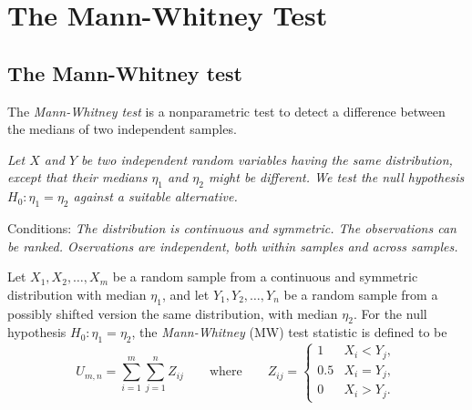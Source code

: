 \chapter{The Mann-Whitney Test}\label{chap:mannwhitney}
\setcounter{page}{1}
\startcontents[chapters]
\chapcontents

\section{The Mann-Whitney test}
The \emph{Mann-Whitney test} is a nonparametric test to detect a difference between the medians of two independent samples.

\bit
\it Let $X$ and $Y$ be two independent random variables having the same distribution, except that their medians $\eta_1$ and $\eta_2$ might be different. 
\it We test the null hypothesis $H_0:\eta_1 = \eta_2$ against a suitable alternative.
\eit

Conditions:
\bit
\it The distribution is continuous and symmetric.
\it The observations can be ranked.
\it Oservations are independent, both within samples and across samples.
\eit

%


\begin{definition}
Let $X_1,X_2,\ldots,X_m$ be a random sample from a continuous and symmetric distribution with median $\eta_1$, and let $Y_1,Y_2,\ldots,Y_n$ be a random sample from a possibly shifted version the same distribution, with median $\eta_2$. For the null hypothesis $H_0:\eta_1=\eta_2$, the \emph{Mann-Whitney} (MW) test statistic is defined to be
\[
U_{m,n} = \sum_{i=1}^m \sum_{j=1}^n Z_{ij} 
\qquad\text{where}\qquad 
Z_{ij} = \begin{cases} 
	1 	& X_i < Y_j, \\
	0.5	& X_i = Y_j, \\
	0	& X_i > Y_j.
\end{cases}
\]
\end{definition}

